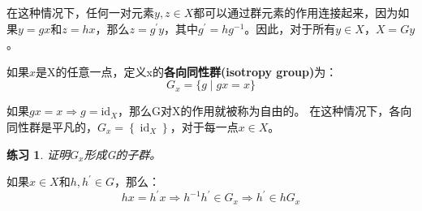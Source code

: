 \documentclass[hyperref,UTF8]{ctexbook}
\newtheorem*{exercise}{练习}
\begin{document}
在这种情况下，任何一对元素$y, z \in X$都可以通过群元素的作用连接起来，因为如果$y=g x$和$z=h x$，那么$z=g^{\prime} y$，其中$g^{\prime}=h g^{-1}$。因此，对于所有$y \in X$，$X=G y$。 

如果$x$是X的任意一点，定义x的\textbf{各向同性群(isotropy group)}为： 
$$
G_{x}=\{g\mid g x=x\}
$$ 

如果$g x=x \Longrightarrow g=\mathrm{id}_{X}$，那么G对X的作用就被称为自由的。 在这种情况下，各向同性群是平凡的，$G_{x}=\left\{\operatorname{id}_{X}\right\}$，对于每一点$x \in X$。 
\begin{exercise}
    证明$G_{x}$形成G的子群。
\end{exercise}

如果$x \in X$和$h, h^{\prime} \in G$，那么： 
$$
h x=h^{\prime} x \Longrightarrow h^{-1} h^{\prime} \in G_{x} \Longrightarrow h^{\prime} \in h G_{x}
$$ 
\end{document}
